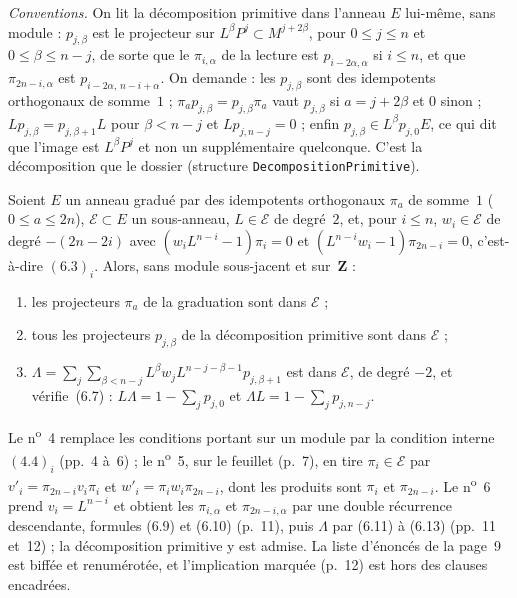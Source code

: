 \noindent\emph{Conventions.} On lit la décomposition primitive dans l'anneau $E$ lui-même, sans module : $p_{j,\beta}$ est le projecteur sur $L^\beta P^j \subset M^{j+2\beta}$, pour $0 \leqslant j \leqslant n$ et $0 \leqslant \beta \leqslant n - j$, de sorte que le $\pi_{i,\alpha}$ de la lecture est $p_{i-2\alpha,\alpha}$ si $i \leqslant n$, et que $\pi_{2n-i,\alpha}$ est $p_{i-2\alpha,\,n-i+\alpha}$. On demande : les $p_{j,\beta}$ sont des idempotents orthogonaux de somme~$1$ ; $\pi_a p_{j,\beta} = p_{j,\beta}\pi_a$ vaut $p_{j,\beta}$ si $a = j + 2\beta$ et $0$ sinon ; $L p_{j,\beta} = p_{j,\beta+1} L$ pour $\beta < n - j$ et $L p_{j,n-j} = 0$ ; enfin $p_{j,\beta} \in L^\beta p_{j,0} E$, ce qui dit que l'image est $L^\beta P^j$ et non un supplémentaire quelconque. C'est la décomposition que le dossier  (structure \texttt{DecompositionPrimitive}).

\begin{encadre}
\begin{theoreme}
Soient $E$ un anneau gradué par des idempotents orthogonaux $\pi_a$ de somme~$1$ ($0 \leqslant a \leqslant 2n$), $\mathcal E \subset E$ un sous-anneau, $L \in \mathcal E$ de degré~$2$, et, pour $i \leqslant n$, $w_i \in \mathcal E$ de degré $-(2n-2i)$ avec $(w_i L^{n-i} - 1)\pi_i = 0$ et $(L^{n-i} w_i - 1)\pi_{2n-i} = 0$, c'est-à-dire $(6.3)_i$. Alors, sans module sous-jacent et sur~$\mathbf Z$ :
\begin{enumerate}
\item les projecteurs $\pi_a$ de la graduation sont dans $\mathcal E$ ;
\item tous les projecteurs $p_{j,\beta}$ de la décomposition primitive sont dans $\mathcal E$ ;
\item $\Lambda = \sum_{j}\sum_{\beta < n-j} L^{\beta} w_j L^{n-j-\beta-1} p_{j,\beta+1}$ est dans $\mathcal E$, de degré $-2$, et vérifie~(6.7) : $L\Lambda = 1 - \sum_j p_{j,0}$ et $\Lambda L = 1 - \sum_j p_{j,n-j}$.
\end{enumerate}
\end{theoreme}
\end{encadre}

\begin{demopage}[pages 4 à 12]
Le n\textsuperscript{o}~4 remplace les conditions portant sur un module par la condition interne $(4.4)_i$ (pp.~4 à~6) ; le n\textsuperscript{o}~5, sur le feuillet  (p.~7), en tire $\pi_i \in \mathcal E$ par $v'_i = \pi_{2n-i}v_i\pi_i$ et $w'_i = \pi_i w_i \pi_{2n-i}$, dont les produits sont $\pi_i$ et $\pi_{2n-i}$. Le n\textsuperscript{o}~6 prend $v_i = L^{n-i}$ et obtient les $\pi_{i,\alpha}$ et $\pi_{2n-i,\alpha}$ par une double récurrence descendante, formules (6.9) et (6.10) (p.~11), puis $\Lambda$ par (6.11) à (6.13) (pp.~11 et~12) ; la décomposition primitive y est admise. La liste d'énoncés de la page~9 est biffée et renumérotée, et l'implication marquée  (p.~12) est hors des clauses encadrées.
\end{demopage}

